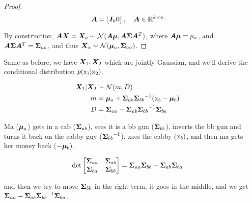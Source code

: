 \begin{tcolorbox}
\begin{proof}
    \begin{equation}
        {\bm{A}} = \begin{bmatrix} {\bm{I}}_k 0 \end{bmatrix}, \quad {\bm{A}} \in {\mathbb{R}}^{k \times n}
    \end{equation}
    
    By construction, ${\bm{A}} {\bm{X}} = {\bm{X}}_a \sim {\mathcal{N}}({\bm{A}} {\bm{\mu}}, {\bm{A}} {\bm{\Sigma}} {\bm{A}}^T)$, where ${\bm{A}} {\bm{\mu}} = \mu_a$, and ${\bm{A}} {\bm{\Sigma}} {\bm{A}}^T = {\bm{\Sigma}}_{aa}$, and thus ${\bm{X}}_a \sim {\mathcal{N}}({\bm{\mu}}_a, {\bm{\Sigma}}_{aa})$.
    
    \end{proof}
    
    \begin{thm}
    Same as before, we have ${\bm{X}}_1, {\bm{X}}_2$ which are jointly Gaussian, and we'll derive the conditional distribution $p({\textnormal{x}}_1 | {\textnormal{x}}_2)$.
    \end{thm}
    
    \begin{align}
        {\bm{X}}_1 | {\bm{X}}_2 & \sim {\mathcal{N}}(m, D) \\
        m &= {\bm{\mu}}_a + {{\bm{\Sigma}}_{ab}} {{\bm{\Sigma}}_{bb}}^{-1} ( {\textnormal{x}}_b - {\bm{\mu}}_b) \\
        D &= {{\bm{\Sigma}}_{aa}} - {{\bm{\Sigma}}_{ab}} {{\bm{\Sigma}}_{bb}}^{-1} {{\bm{\Sigma}}_{ba}}
    \end{align}
    
    Ma (${\bm{\mu}}_a$) gets in a cab (${{\bm{\Sigma}}_{ab}}$), sees it is a bb gun (${{\bm{\Sigma}}_{bb}}$), inverts the bb gun and turns it back on the cabby guy (${{\bm{\Sigma}}_{bb}}^{-1}$), xses the cabby (${\textnormal{x}}_b)$, and then ma gets her money back ($- {\bm{\mu}}_b)$.
    
    \begin{equation}
        \det \begin{bmatrix}
            {\bm{\Sigma}}_{aa} & {\bm{\Sigma}}_{ab} \\
            {\bm{\Sigma}}_{ba} & {\bm{\Sigma}}_{bb}
        \end{bmatrix} = {{\bm{\Sigma}}_{aa}} {{\bm{\Sigma}}_{bb}} - {{\bm{\Sigma}}_{ab}} {{\bm{\Sigma}}_{ba}}
    \end{equation}
    
    and then we try to move ${{\bm{\Sigma}}_{bb}}$ in the right term, it goes in the middle, and we get ${{\bm{\Sigma}}_{aa}} - {{\bm{\Sigma}}_{ab}} {{\bm{\Sigma}}_{bb}}^{-1} {{\bm{\Sigma}}_{ba}}$.

\end{tcolorbox}

